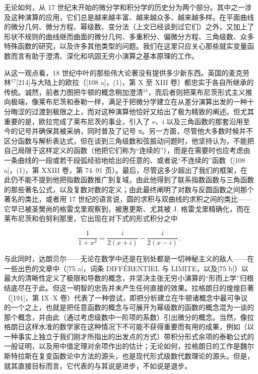 无论如何，从 17 世纪末开始的微分学和积分学的历史分为两个部分。其中之一涉及这种演算的应用，它们总是越来越丰富、越来越众多、越来越多样。在平面曲线的微分几何、微分方程、幂级数、变分法（上文已经谈到过它们）之外，又加上了形状不规则的曲线继而曲面的微分几何、多重积分、偏微分方程、三角级数、众多特殊函数的研究，以及许多其他类型的问题。我们在这里只应关心那些就实变量函数而言有助于澄清、深化和巩固无穷小演算之基本原理的工作。

从这一观点看，18 世纪中叶的那些伟大论著没有提供多少新东西。英国的麦克劳林\(^{17}\){[}214{]}与大陆上的欧拉（{[}108 a{]}，(1)，第 X 至 XIII 卷）都忠实于各自所继承的传统。诚然，前者力图把牛顿的概念稍加澄清\(^{18}\)，而后者则把莱布尼茨形式主义推向极端，像莱布尼茨和泰勒一样，满足于把微分学建立在从差分演算出发的一种十分晦涩的过渡到极限之上，而对这种演算他恰好又给出了极为精致的阐述。但尤其重要的是，欧拉完成了莱布尼茨的事业，引入了 e、i 以及三角函数的那套沿用至今的记号并确保其被采纳，同时普及了记号 π。另一方面，尽管他大多数时候并不区分函数与解析表达式，但在谈到三角级数和弦振动问题时，他坚持认为，不能把自己局限于这样定义的函数（他把它们称为“连续的”），而是在需要时也应考虑由一条曲线的一段或若干段弧经验地给出的任意的、或者说“不连续的”函数（{[}108 a{]}，(1)，第 XXIII 卷，第 74–91 页）。最后，尽管这多少超出了我们的框架，在此仍不能不提到他把指数函数推广到复域，由此他得到了联系指数函数与三角函数的那些著名公式，以及复数对数的定义；由此最终阐明了对数与反圆函数之间那个著名的类比，或者用 17 世纪的语言说，圆的求积与双曲线的求积之间的类比——它早已被圣樊尚的格雷戈里观察到，被惠更斯、尤其被 J. 格雷戈里精确化，而在莱布尼茨和伯努利那里，它出现在对下式的形式积分之中

\[
\frac {1}{1 + x ^ {2}} = \frac {i}{2 (x + i)} - \frac {i}{2 (x - i)}.
\]

与此同时，达朗贝尔——无论在数学中还是在别处都是一切神秘主义的敌人——在一些出色的文章中（{[}75 a{]}，词条 DIFFÉRENTIEL 与 LIMITE，以及{[}75 b{]}）以最大的清晰性定义了极限和导数的概念，并坚决主张无穷小演算的“形而上学”归根结底尽在于此。但这一明智的忠告并未产生任何直接的效果。拉格朗日的煌煌巨著（{[}191{]}，第 IX–X 卷）代表了一种尝试，即把分析建立在牛顿诸概念中最可争议的一个之上，也就是把任意函数的概念与可展开为幂级数的函数的概念混为一谈的那个概念，并由此（通过考虑级数中一阶项的系数）引出微分的概念。当然，像拉格朗日这样水准的数学家在这种情况下不可能不获得重要而有用的成果，例如（以一种事实上独立于我们刚才所指出的出发点的方式）带积分形式余项的泰勒公式的一般证明，以及用中值定理对余项作出的估计；无论如何，拉格朗日的工作是魏尔斯特拉斯在复变函数论中方法的源头，也是现代形式级数代数理论的源头。但是，就其直接目标而言，它代表的与其说是进步，不如说是退步。

